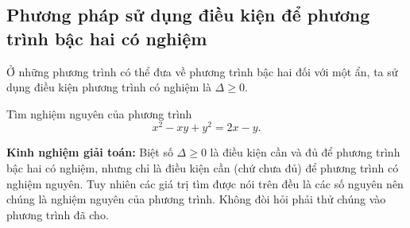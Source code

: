 \subsection{Phương pháp sử dụng điều kiện để phương trình bậc hai có nghiệm}
Ở những phương trình có thể đưa về phương trình bậc hai đối với một ẩn, ta sử dụng điều kiện phương trình có nghiệm là $\Delta \geq 0$.
\begin{vd}
Tìm nghiệm nguyên của phương trình
$$x^2-xy+y^2=2x-y.$$
\end{vd}
\textbf{Kinh nghiệm giải toán:}
Biệt số $\Delta \geq 0$ là điều kiện cần và đủ  để phương trình bậc hai có nghiệm, nhưng chỉ là điều kiện cần (chứ chưa đủ) để phương trình có nghiệm nguyên. Tuy nhiên các giá trị tìm được nói trên đều là các số nguyên nên chúng là nghiệm nguyên của phương trình. Không đòi hỏi phải thử chúng vào phương trình đã cho.
